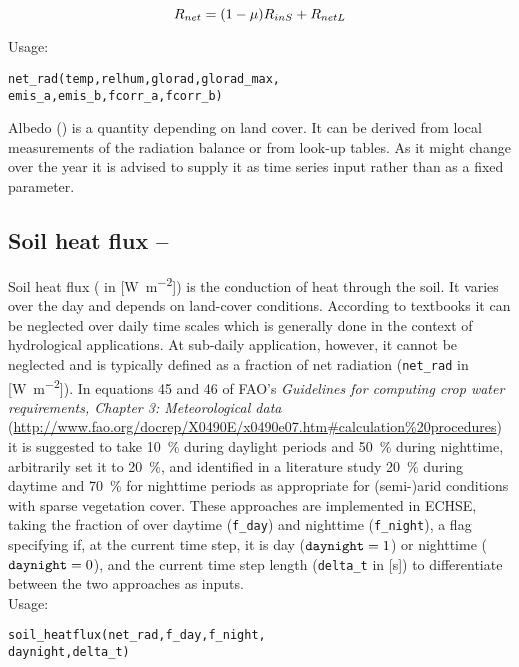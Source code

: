 \begin{equation}\label{eqn:meteo:radnet}
R_{net}{} = (1 - \mu{}) R_{inS}{} + R_{netL}{}
\end{equation}

\noindent
Usage:
\begin{verbatim}
net_rad(temp,relhum,glorad,glorad_max,
emis_a,emis_b,fcorr_a,fcorr_b)
\end{verbatim}

Albedo (\albedo{}) is a quantity depending on land cover. It can be derived from local measurements of the radiation balance or from look-up tables. As it might change over the year it is advised to supply it as time series input rather than as a fixed parameter.


\subsection{Soil heat flux -- \heatfluxSoil} \label{sec:meteo:soilflux}
Soil heat flux (\heatfluxSoil{} in [\si{\watt\per\metre\squared}]) is the conduction of heat through the soil. It varies over the day and depends on land-cover conditions. According to textbooks it can be neglected over daily time scales which is generally done in the context of hydrological applications. At sub-daily application, however, it cannot be neglected and is typically defined as a fraction of net radiation \netRadiation{} (\verb!net_rad! in [\si{\watt\per\metre\squared}]). In equations 45 and 46 of FAO's \emph{Guidelines for computing crop water requirements, Chapter 3: Meteorological data} (\url{http://www.fao.org/docrep/X0490E/x0490e07.htm#calculation\%20procedures}) it is suggested to take \SI{10}{\percent} during daylight periods and \SI{50}{\percent} during nighttime, \citet{Shuttleworth1985} arbitrarily set it to \SI{20}{\percent}, and \citet{Guentner2002} identified in a literature study \SI{20}{\percent} during daytime and \SI{70}{\percent} for nighttime periods as appropriate for (semi-)arid conditions with sparse vegetation cover. These approaches are implemented in ECHSE, taking the fraction of \netRadiation{} over daytime (\verb!f_day!) and nighttime (\verb!f_night!), a flag specifying if, at the current time step, it is day ($\verb!daynight! = 1$) or nighttime ($\verb!daynight! = 0$), and the current time step length (\verb!delta_t! in [\si{\second}]) to differentiate between the two approaches as inputs.\\

\noindent
Usage:
\begin{verbatim}
soil_heatflux(net_rad,f_day,f_night,
daynight,delta_t)
\end{verbatim}

